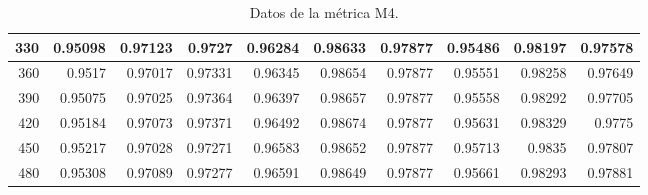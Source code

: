 \begin{table}[h]
\begin{tabular}{|r|r|r|r|r|r|r|r|r|r|}
			\hline \tiny 330 &{\tiny 0.95098}	&{\tiny 0.97123}	&{\tiny 0.9727}	&{\tiny 0.96284}	&{\tiny 0.98633}	&{\tiny 0.97877}	&{\tiny 0.95486}	&{\tiny 0.98197}	&{\tiny 0.97578} \\
			\hline \tiny 360 &{\tiny 0.9517}	&{\tiny 0.97017}	&{\tiny 0.97331}	&{\tiny 0.96345}	&{\tiny 0.98654}	&{\tiny 0.97877}	&{\tiny 0.95551}	&{\tiny 0.98258}	&{\tiny 0.97649} \\
			\hline \tiny 390 &{\tiny 0.95075}	&{\tiny 0.97025}	&{\tiny 0.97364}	&{\tiny 0.96397}	&{\tiny 0.98657}	&{\tiny 0.97877}	&{\tiny 0.95558}	&{\tiny 0.98292}	&{\tiny 0.97705} \\
			\hline \tiny 420 &{\tiny 0.95184}	&{\tiny 0.97073}	&{\tiny 0.97371}	&{\tiny 0.96492}	&{\tiny 0.98674}	&{\tiny 0.97877}	&{\tiny 0.95631}	&{\tiny 0.98329}	&{\tiny 0.9775} \\
			\hline \tiny 450 &{\tiny 0.95217}	&{\tiny 0.97028}	&{\tiny 0.97271}	&{\tiny 0.96583}	&{\tiny 0.98652}	&{\tiny 0.97877}	&{\tiny 0.95713}	&{\tiny 0.9835}	&{\tiny 0.97807} \\
			\hline \tiny 480 &{\tiny 0.95308}	&{\tiny 0.97089}	&{\tiny 0.97277}	&{\tiny 0.96591}	&{\tiny 0.98649}	&{\tiny 0.97877}	&{\tiny 0.95661}	&{\tiny 0.98293}	&{\tiny 0.97881} \\						
			\hline								
		\end{tabular}
		\caption{Datos de la m\'etrica M4.}	 
   \label{tabA4}	
\end{table}

